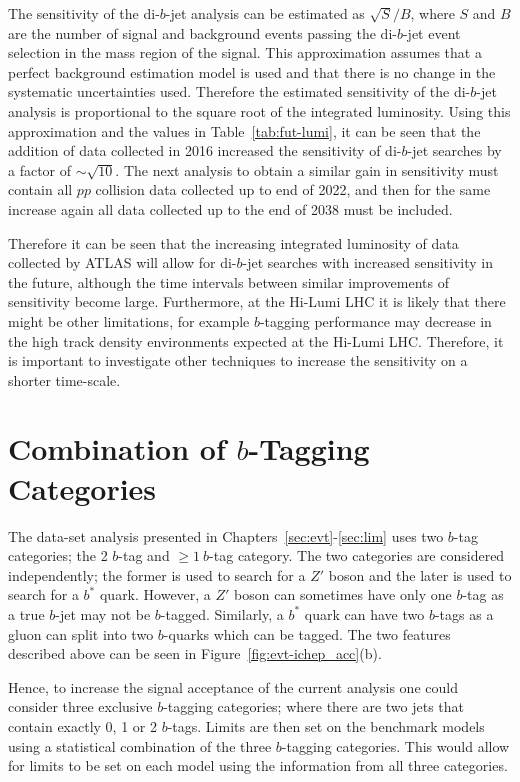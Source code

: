 The sensitivity of the di-$b$-jet analysis can be estimated as $\sqrt{S}/B$,
where $S$ and $B$ are the number of signal and background events passing the di-$b$-jet event selection in the mass region of the signal.
This approximation assumes that a perfect background estimation model is used and that there is no change in the systematic uncertainties used.
Therefore the estimated sensitivity of the di-$b$-jet analysis is proportional to the square root of the integrated luminosity.
Using this approximation and the values in Table~\ref{tab:fut-lumi}, it can be seen that the addition of data collected in 2016
increased the sensitivity of di-$b$-jet searches by a factor of $\sim\sqrt{10}$.
The next analysis to obtain a similar gain in sensitivity must contain all $pp$ collision data collected up to end of 2022,
and then for the same increase again all data collected up to the end of 2038 must be included.

Therefore it can be seen that the increasing integrated luminosity of data collected by ATLAS will
allow for di-$b$-jet searches with increased sensitivity in the future,
although the time intervals between similar improvements of sensitivity become large.
Furthermore, at the Hi-Lumi LHC it is likely that there might be other limitations,
for example $b$-tagging performance may decrease in the high track density environments expected at the Hi-Lumi LHC.
Therefore, it is important to investigate other techniques to increase the sensitivity on a shorter time-scale.

\section{Combination of $b$-Tagging Categories}

The \summer{} data-set analysis presented in Chapters~\ref{sec:evt}-\ref{sec:lim} uses
two $b$-tag categories; the 2 $b$-tag and $\geq1~b$-tag category.
The two categories are considered independently;
the former is used to search for a $Z'$ boson and the later is used to search for a $b^{*}$ quark.
However, a $Z'$ boson can sometimes have only one $b$-tag as a true $b$-jet may not be $b$-tagged.
Similarly, a $b^*$ quark can have two $b$-tags as a gluon can split into two $b$-quarks which can be tagged.
The two features described above can be seen in Figure~\ref{fig:evt-ichep_acc}(b).

Hence, to increase the signal acceptance of the current analysis one could consider three exclusive $b$-tagging categories;
where there are two jets that contain exactly 0, 1 or 2 $b$-tags.
Limits are then set on the benchmark models using a statistical combination of the three $b$-tagging categories.
This would allow for limits to be set on each model using the information from all three categories.

